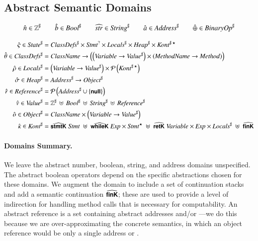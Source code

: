 \documentclass[10pt]{article}
\begin{document}
\subsection{Abstract Semantic Domains}
\label{ssec:adomains}

\begin{gather*}
  \an \in \AInt \qquad \ab \in \ABool \qquad \astr \in \AString \qquad
  \aad \in \AAddress \qquad \abinop \in \ABinOp
\end{gather*}

\nvsp\nvsp
\begin{align*}
  \astate \in \AState &= \AClasses \times \sopt{\Stmt} \times \ALocal \times
  \AHeap \times \sseq{\AKont\ \!} 
  \\
  \aclasses \in \AClasses &= \CName \to \left(\left(\Variable \to
  \AValue\right) \times \left(\MName \to \Method\right)\right)
  \\
  \alocal \in \ALocal &= \left(\Variable \to \AValue\right) \times
  \power\left(\sseq{\AKont\ \!}\right)
  \\
  \aheap \in \AHeap &= \AAddress \to \AObject
  \\
  \aref \in \ARef &= \power\left(\AAddress \cup \{ \nullv \}\right) 
  \\
  \av \in \AValue &= \AInt \,\uplus\, \ABool \,\uplus\, \AString \,\uplus\,
  \ARef
  \\
  \ao \in \AObject &= \CName \times \left(\Variable \to \AValue\right)
  \\
  \akont \in \AKont &= \asstmtk{\Stmt} \;\uplus\; \aswhilek{\Exp}{\sseq{\Stmt}}
  \;\uplus\; \asretk{\Variable}{\Exp}{\ALocal} \;\uplus\; \asfink
\end{align*}

\paragraph{Domains Summary.} We leave the abstract number, boolean,
string, and address domains unspecified. The abstract boolean
operators depend on the specific abstractions chosen for these
domains. We augment the \ALocal domain to include a set of
continuation stacks and add a semantic continuation $\asfink$; these
are used to provide a level of indirection for handling method calls
that is necessary for computability. An abstract reference is a set
containing abstract addresses and/or \nullv---we do this because we
are over-approximating the concrete semantics, in which an object
reference would be only a single address or \nullv.
\end{document}
